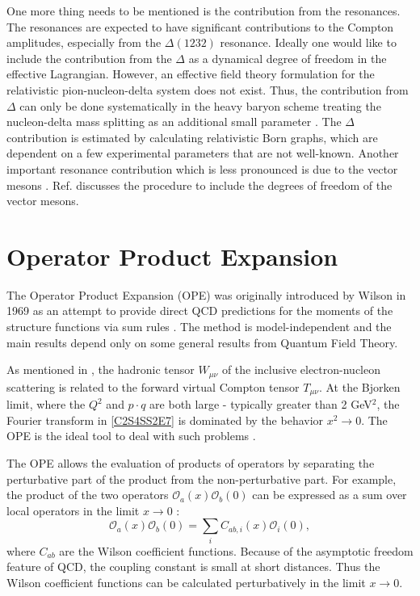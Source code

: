 One more thing needs to be mentioned is the contribution from the resonances. The resonances are expected to have significant contributions to the Compton amplitudes, especially from the $\Delta(1232)$ resonance. Ideally one would like to include the contribution from the $\Delta$ as a dynamical degree of freedom in the effective Lagrangian. However, an effective field theory formulation for the relativistic pion-nucleon-delta system does not exist. Thus, the contribution from $\Delta$ can only be done systematically in the heavy baryon scheme treating the nucleon-delta mass splitting as an additional small parameter \cite{Hemmert1998}. The $\Delta$ contribution is estimated by calculating relativistic Born graphs, which are dependent on a few experimental parameters that are not well-known. Another important resonance contribution which is less pronounced is due to the vector mesons \cite{Bernard2003}. Ref. \cite{Kubis2001} discusses the procedure to include the degrees of freedom of the vector mesons.

\section{Operator Product Expansion}
\label{C3S2}

The Operator Product Expansion (OPE) was originally introduced by Wilson in 1969 as an attempt to provide direct QCD predictions for the moments of the structure functions via sum rules \cite{Wilson1969}. The method is model-independent and the main results depend only on some general results from Quantum Field Theory.

As mentioned in , the hadronic tensor $W_{\mu\nu}$ of the inclusive electron-nucleon scattering is related to the forward virtual Compton tensor $T_{\mu\nu}$. At the Bjorken limit, where the $Q^2$ and $p\cdot q$ are both large - typically greater than 2 GeV${}^2$, the Fourier transform in \cref{C2S4SS2E7} is dominated by the behavior $x^2\rightarrow 0$. The OPE is the ideal tool to deal with such problems \cite{Thomas2001}.

The OPE allows the evaluation of products of operators by separating the perturbative part of the product from the non-perturbative part. For example, the product of the two operators $\mathcal{O}_a(x)\mathcal{O}_b(0)$ can be expressed as a sum over local operators in the limit $x\rightarrow 0$ \cite{Manohar1992}:
\begin{equation} \label{C3S2E1}
\mathcal{O}_a(x)\mathcal{O}_b(0) = \sum_iC_{ab,i}(x)\mathcal{O}_i(0),
\end{equation}
where $C_{ab}$ are the Wilson coefficient functions. Because of the asymptotic freedom feature of QCD, the coupling constant is small at short distances. Thus the Wilson coefficient functions can be calculated perturbatively in the limit $x\rightarrow 0$.

